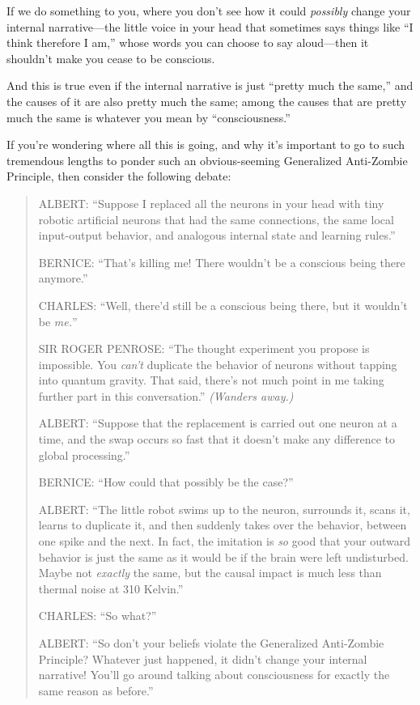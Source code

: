 {
 If we do something to you, where you don't see how
it could \textit{possibly} change your internal narrative---the little
voice in your head that sometimes says things like ``I
think therefore I am,'' whose words you can choose to
say aloud---then it shouldn't make you cease to be
conscious.}

{
 And this is true even if the internal narrative is just
``pretty much the same,'' and the
causes of it are also pretty much the same; among the causes that are
pretty much the same is whatever you mean by
``consciousness.''}

{
 If you're wondering where all this is going, and
why it's important to go to such tremendous lengths to
ponder such an obvious-seeming Generalized Anti-Zombie Principle, then
consider the following debate:}

\begin{quotation}
{
 ALBERT: ``Suppose I replaced all the neurons in
your head with tiny robotic artificial neurons that had the same
connections, the same local input-output behavior, and analogous
internal state and learning rules.''}

{
 BERNICE: ``That's killing me!
There wouldn't be a conscious being there
anymore.''}

{
 CHARLES: ``Well, there'd still be
a conscious being there, but it wouldn't be
\textit{me.}''}

{
 SIR ROGER PENROSE: ``The thought experiment you
propose is impossible. You \textit{can't} duplicate the
behavior of neurons without tapping into quantum gravity. That said,
there's not much point in me taking further part in
this conversation.'' \textit{(Wanders away.)}}

{
 ALBERT: ``Suppose that the replacement is carried
out one neuron at a time, and the swap occurs so fast that it
doesn't make any difference to global
processing.''}

{
 BERNICE: ``How could that possibly be the
case?''}

{
 ALBERT: ``The little robot swims up to the
neuron, surrounds it, scans it, learns to duplicate it, and then
suddenly takes over the behavior, between one spike and the next. In
fact, the imitation is \textit{so} good that your outward behavior is
just the same as it would be if the brain were left undisturbed. Maybe
not \textit{exactly} the same, but the causal impact is much less than
thermal noise at 310 Kelvin.''}

{
 CHARLES: ``So what?''}

{
 ALBERT: ``So don't your beliefs
violate the Generalized Anti-Zombie Principle? Whatever just happened,
it didn't change your internal narrative!
You'll go around talking about consciousness for
exactly the same reason as before.''}


\end{quotation}
